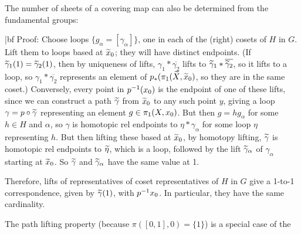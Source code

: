\bsk


The number of sheets of a covering map can also be determined 
from the fundamental groups:

\msk


\msk

{|bf Proof:} Choose loops $\{g_\alpha=[\gamma_\alpha]\}$, one in 
each of the (right) cosets of $H$ in $G$. Lift
them to loops based at $\widetilde{x}_0$; they will have distinct
endpoints. (If $\widetilde{\gamma}_1(1)=\widetilde{\gamma}_2(1)$, then 
by uniqueness of lifts, $\gamma_1*\overline{\gamma_2}$ lifts to 
$\widetilde{\gamma}_1*\overline{\widetilde{\gamma}_2}$, so it
lifts to a loop, so $\gamma_1*\overline{\gamma_2}$ represents
an element of $p_*(\pi_1(\widetilde{X},\widetilde{x}_0)$, so they are
in the same coset.)
Conversely, every point in $p^{-1}(x_0)$ is the endpoint of one of these
lifts, since we can construct a path $\widetilde{\gamma}$
from $\widetilde{x}_0$ to any such point $y$, giving a loop
$\gamma=p\circ \widetilde{\gamma}$ representing an element $g\in\pi_1(X,x_0)$.
But then $g=hg_\alpha$ for some $h\in H$ and $\alpha$, 
so $\gamma$ is homotopic rel endpoints to $\eta*\gamma_\alpha$ for some loop
$\eta$ representing $h$. But then lifting these based at $\widetilde{x}_0$, by homotopy
lifting, $\widetilde{\gamma}$ is homotopic rel endpoints to $\widetilde{\eta}$, which is a 
loop, followed by the lift $\widetilde{\gamma}_\alpha$ of $\gamma_\alpha$
starting at $\widetilde{x}_0$. So $\widetilde{\gamma}$ and 
$\widetilde{\gamma}_\alpha$ have the same value at 1.

\ssk

Therefore, lifts of representatives of coset representatives of $H$ in $G$ give
a 1-to-1 correspondence, given by $\widetilde{\gamma}(1)$, with $p^{-1}{x_0}$.
In particular, they have the same cardinality.

\vfill
\eject

The path lifting property (because $\pi([0,1],0)=\{1\}$) is a special
case of the 


\msk

